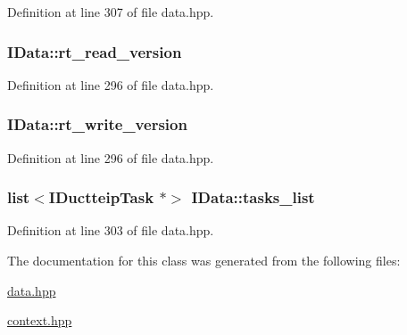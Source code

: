 Definition at line 307 of file data.hpp.\hypertarget{class_i_data_a62fa408732cc79c91cc5af22ff52f5bd}{
\subsubsection[{rt\_\-read\_\-version}]{ {\bf IData::rt\_\-read\_\-version}}}
\label{class_i_data_a62fa408732cc79c91cc5af22ff52f5bd}


Definition at line 296 of file data.hpp.\hypertarget{class_i_data_a633fad3f15a6898694a85dd74c94d89a}{
\subsubsection[{rt\_\-write\_\-version}]{ {\bf IData::rt\_\-write\_\-version}}}
\label{class_i_data_a633fad3f15a6898694a85dd74c94d89a}


Definition at line 296 of file data.hpp.\hypertarget{class_i_data_a319a3f8f7280bab52ddea7843f5398f1}{
\subsubsection[{tasks\_\-list}]{\setlength{\rightskip}{0pt plus 5cm}list$<${\bf IDuctteipTask} $\ast$$>$ {\bf IData::tasks\_\-list}}}
\label{class_i_data_a319a3f8f7280bab52ddea7843f5398f1}


Definition at line 303 of file data.hpp.

The documentation for this class was generated from the following files:\begin{DoxyCompactItemize}
\item 
\hyperlink{data_8hpp}{data.hpp}\item 
\hyperlink{context_8hpp}{context.hpp}\end{DoxyCompactItemize}
